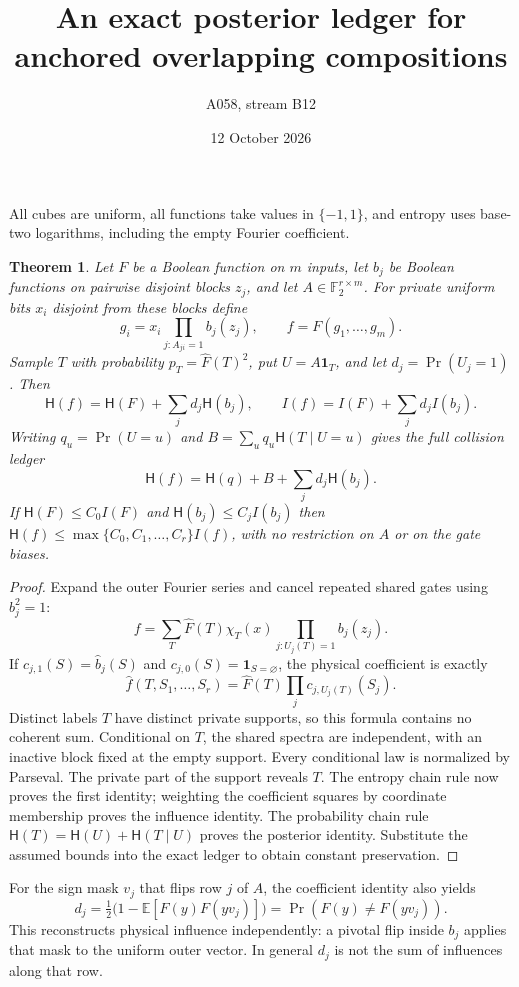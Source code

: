 \documentclass[11pt]{article}
\newtheorem{theorem}{Theorem}
\newcommand{\HH}{\mathsf H}
\begin{document}
\title{An exact posterior ledger for anchored overlapping compositions}
\author{A058, stream B12}
\date{12 October 2026}
\maketitle
All cubes are uniform, all functions take values in $\{-1,1\}$, and entropy uses base-two logarithms, including the empty Fourier coefficient.
\begin{theorem}
Let $F$ be a Boolean function on $m$ inputs, let $b_j$ be Boolean functions on pairwise disjoint blocks $z_j$, and let $A\in\mathbb F_2^{r\times m}$. For private uniform bits $x_i$ disjoint from these blocks define
\[
g_i=x_i\prod_{j:A_{ji}=1}b_j(z_j),\qquad f=F(g_1,\ldots,g_m).
\]
Sample $T$ with probability $p_T=\widehat F(T)^2$, put $U=A\mathbf1_T$, and let $d_j=\Pr(U_j=1)$. Then
\[
\HH(f)=\HH(F)+\sum_j d_j\HH(b_j),\qquad
I(f)=I(F)+\sum_j d_jI(b_j).
\]
Writing $q_u=\Pr(U=u)$ and $B=\sum_u q_u\HH(T\mid U=u)$ gives the full collision ledger
\[
\HH(f)=\HH(q)+B+\sum_j d_j\HH(b_j).
\]
If $\HH(F)\le C_0I(F)$ and $\HH(b_j)\le C_jI(b_j)$ then $\HH(f)\le \max\{C_0,C_1,\ldots,C_r\}I(f)$, with no restriction on $A$ or on the gate biases.
\end{theorem}
\begin{proof}
Expand the outer Fourier series and cancel repeated shared gates using $b_j^2=1$:
\[
f=\sum_T\widehat F(T)\chi_T(x)\prod_{j:U_j(T)=1}b_j(z_j).
\]
If $c_{j,1}(S)=\widehat b_j(S)$ and $c_{j,0}(S)=\mathbf1_{S=\varnothing}$, the physical coefficient is exactly
\[
\widehat f(T,S_1,\ldots,S_r)=\widehat F(T)\prod_jc_{j,U_j(T)}(S_j).
\]
Distinct labels $T$ have distinct private supports, so this formula contains no coherent sum. Conditional on $T$, the shared spectra are independent, with an inactive block fixed at the empty support. Every conditional law is normalized by Parseval. The private part of the support reveals $T$. The entropy chain rule now proves the first identity; weighting the coefficient squares by coordinate membership proves the influence identity. The probability chain rule $\HH(T)=\HH(U)+\HH(T\mid U)$ proves the posterior identity. Substitute the assumed bounds into the exact ledger to obtain constant preservation.
\end{proof}
For the sign mask $v_j$ that flips row $j$ of $A$, the coefficient identity also yields
\[
d_j=\tfrac12\bigl(1-\mathbb E[F(y)F(yv_j)]\bigr)=\Pr(F(y)\ne F(yv_j)).
\]
This reconstructs physical influence independently: a pivotal flip inside $b_j$ applies that mask to the uniform outer vector. In general $d_j$ is not the sum of influences along that row.
\end{document}
